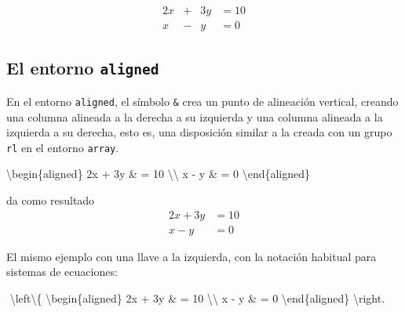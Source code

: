 \documentclass[
  letterpaper,
  DIV=11,
  numbers=noendperiod]{scrartcl}
\newenvironment{Shaded}{\begin{snugshade}}{\end{snugshade}}
\newcommand{\ExtensionTok}[1]{\textcolor[rgb]{0.00,0.23,0.31}{#1}}
\newcommand{\FunctionTok}[1]{\textcolor[rgb]{0.28,0.35,0.67}{#1}}
\newcommand{\KeywordTok}[1]{\textcolor[rgb]{0.00,0.23,0.31}{#1}}
\newcommand{\NormalTok}[1]{\textcolor[rgb]{0.00,0.23,0.31}{#1}}
\newcommand{\SpecialCharTok}[1]{\textcolor[rgb]{0.37,0.37,0.37}{#1}}
\newcommand{\SpecialStringTok}[1]{\textcolor[rgb]{0.13,0.47,0.30}{#1}}
\begin{document}
\[
\begin{alignedat}{2} 
2x & + {}   &  3y  & =  10 \\ 
 x & - {}   &   y  & =  0 
\end{alignedat}
\]

\hypertarget{el-entorno-aligned}{%
\subsection{\texorpdfstring{El entorno
\texttt{aligned}}{El entorno aligned}}\label{el-entorno-aligned}}

En el entorno \texttt{aligned}, el símbolo \texttt{\&} crea un punto de
alineación vertical, creando una columna alineada a la derecha a su
izquierda y una columna alineada a la izquierda a su derecha, esto es,
una disposición similar a la creada con un grupo \texttt{rl} en el
entorno \texttt{array}.

\begin{Shaded}
\begin{Highlighting}[]
\KeywordTok{\textbackslash{}begin}\NormalTok{\{}\ExtensionTok{aligned}\NormalTok{\} }
\NormalTok{2x + 3y \& =  10 }\FunctionTok{\textbackslash{}\textbackslash{}}
\NormalTok{  x {-} y \& =  0 }
\KeywordTok{\textbackslash{}end}\NormalTok{\{}\ExtensionTok{aligned}\NormalTok{\}}
\end{Highlighting}
\end{Shaded}

da como resultado \[
\begin{aligned} 
2x + 3y & =  10 \\
  x - y & =  0 
\end{aligned}
\]

El mismo ejemplo con una llave a la izquierda, con la notación habitual
para sistemas de ecuaciones:

\begin{Shaded}
\begin{Highlighting}[]
\SpecialStringTok{$$}
\SpecialCharTok{\textbackslash{}left\textbackslash{}\{}
\KeywordTok{\textbackslash{}begin}\NormalTok{\{}\ExtensionTok{aligned}\NormalTok{\}}\SpecialStringTok{ }
\SpecialStringTok{2x + 3y \& =  10 }\SpecialCharTok{\textbackslash{}\textbackslash{}}
\SpecialStringTok{  x {-} y \& =  0 }
\KeywordTok{\textbackslash{}end}\NormalTok{\{}\ExtensionTok{aligned}\NormalTok{\}}
\SpecialCharTok{\textbackslash{}right}\SpecialStringTok{.}
\SpecialStringTok{$$}
\end{Highlighting}
\end{Shaded}
\end{document}
